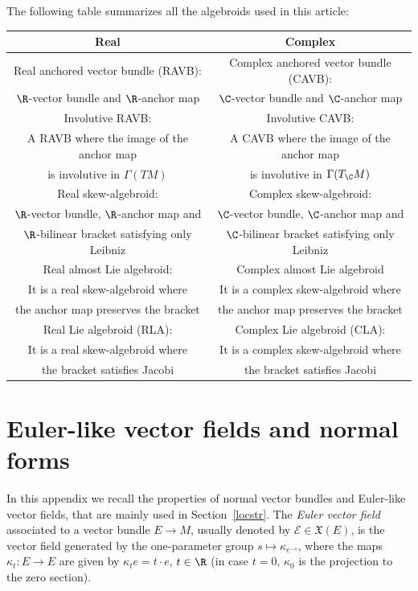The following table summarizes all the algebroids used in this article:
\begin{center}
    \begin{tabular}{@{}c|c@{}}
      Real & Complex\\
      \hline
Real anchored vector bundle (RAVB): & Complex anchored vector bundle (CAVB):\\
$\R$-vector bundle and $\R$-anchor map & $\C$-vector bundle and $\C$-anchor map\\
\hline
Involutive RAVB: & Involutive CAVB:\\
A RAVB where the image of the anchor map & A CAVB where the image of the anchor map\\
 is involutive in $\Gamma(TM)$ & is involutive in $\Gamma(T_{\C}M)$ \\
\hline
 Real skew-algebroid: & Complex skew-algebroid: \\
$\R$-vector bundle, $\R$-anchor map and &
$\C$-vector bundle, $\C$-anchor map and\\
$\R$-bilinear bracket satisfying only Leibniz & $\C$-bilinear bracket satisfying only Leibniz \\
\hline
Real almost Lie algebroid: & Complex almost Lie algebroid \\
It is a real skew-algebroid where &
It is a complex skew-algebroid where\\
 the anchor map preserves the bracket & the anchor map preserves the bracket \\
\hline
Real Lie algebroid (RLA): & Complex Lie algebroid (CLA):\\
It is a real skew-algebroid where &
It is a complex skew-algebroid where\\
 the bracket satisfies Jacobi & the bracket satisfies Jacobi \\
\hline
    \end{tabular}
    \end{center}

\section{Euler-like vector fields and normal forms}\label{preliminarieslocstr}
 In this appendix we recall the properties of normal vector bundles and Euler-like vector fields, that are mainly used in Section~\ref{locstr}.
The {\em Euler vector field} associated to a vector bundle $E\to M$, usually denoted by $\mathcal{E}\in \mathfrak{X}(E)$, is the vector field generated by the one-parameter group $s\mapsto \kappa_{e^{-s}}$, where the maps $\kappa_{t}\colon E\to E$ are given by $\kappa_{t}e=t\cdot e$, $t\in \R$ (in case $t=0$, $\kappa_0$ is the projection to the zero section).


